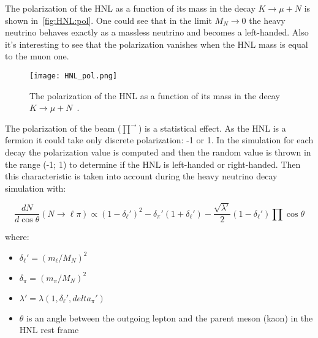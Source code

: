 \documentclass[../main.tex]{subfiles}
\begin{document}
The polarization of the HNL as a function of its mass in the decay $K\to\mu+N$ is shown in~\autoref{fig:HNL:pol}. One could see that in the limit $M_N\to0$ the heavy neutrino behaves exactly as a massless neutrino and becomes a left-handed. Also it's interesting to see that the polarization vanishes when the HNL mass is equal to the muon one.

\begin{figure}[!ht]
    \centering
    \texttt{[image: HNL\_pol.png]}
    \caption{The polarization of the HNL as a function of its mass in the decay $K\to\mu+N$~\cite{Abgrall2014}.}
    \label{fig:HNL:pol}
\end{figure}

The polarization of the beam ($\overrightarrow{\prod}$) is a statistical effect. As the HNL is a fermion it could take only  discrete polarization: -1 or 1. In the simulation for each decay the polarization value is computed and then the random value is thrown in the range (-1; 1) to determine if the HNL is left-handed or right-handed. Then this characteristic is taken into account during the heavy neutrino decay simulation with:

\begin{equation}
    \frac{dN}{d\cos\theta}\left(N\to\ell\pi\right)\propto\left(1-\delta_\ell'\right)^2-\delta_\pi'\left(1+\delta_\ell'\right)-\frac{\sqrt{\lambda'}}{2}\left(1-\delta_\ell'\right)\prod\cos\theta
\end{equation}

where:
\begin{itemize}
    \item $\delta_\ell'=\left(m_\ell/M_N\right)^2$
    \item $\delta_\pi=\left(m_\pi/M_N\right)^2$
    \item $\lambda'=\lambda\left(1, \delta_\ell', delta_\pi'\right)$
    \item $\theta$ is an angle between the outgoing lepton and the parent meson (kaon) in the HNL rest frame
\end{itemize}
\end{document}
